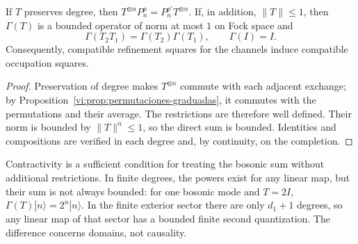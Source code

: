 \begin{theorem}
\label{vi:thm:fock-naturalidad}
If \(T\) preserves degree, then
\(T^{\otimes n}P_n^p=P_n^{p'}T^{\otimes n}\).
If, in addition, \(\|T\|\le1\), then \(\Gamma(T)\) is a
bounded operator of norm at most \(1\) on Fock space and
\[
 \Gamma(T_2T_1)=\Gamma(T_2)\Gamma(T_1),\qquad
 \Gamma(I)=I.
\]
Consequently, compatible refinement squares for the channels
induce compatible occupation squares.
\end{theorem}
\begin{proof}
Preservation of degree makes \(T^{\otimes n}\) commute with
each adjacent exchange; by
Proposition~\ref{vi:prop:permutaciones-graduadas}, it commutes
with the permutations and their average. The restrictions are
therefore well defined. Their norm is bounded by
\(\|T\|^n\le1\), so the direct sum is bounded.
Identities and compositions are verified in each degree and,
by continuity, on the completion.
\end{proof}

Contractivity is a sufficient condition for treating the bosonic sum
without additional restrictions. In finite degrees, the powers exist
for any linear map, but their sum is not always bounded:
for one bosonic mode and \(T=2I\),
\(\Gamma(T)|n\rangle=2^n|n\rangle\).
In the finite exterior sector there are only \(d_1+1\) degrees,
so any linear map of that sector has a bounded finite second
quantization. The difference concerns domains, not causality.

